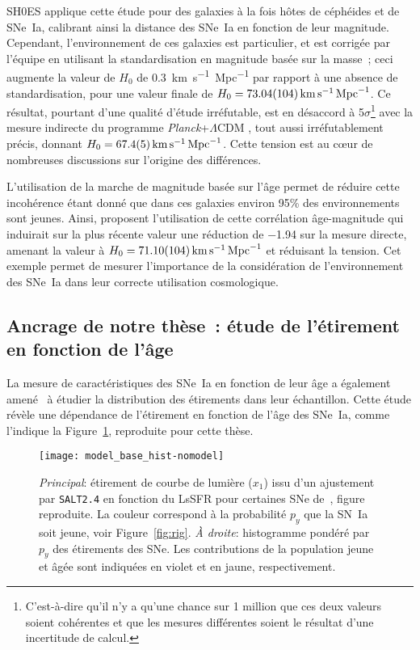 \documentclass[../main/main.tex]{subfiles}
\begin{document}
SH0ES applique cette étude pour des galaxies à la fois hôtes de céphéides et de
SNe~Ia, calibrant ainsi la distance des SNe~Ia en fonction de leur magnitude.
Cependant, l'environnement de ces galaxies est particulier, et est corrigée par
l'équipe en utilisant la standardisation en magnitude basée sur la masse~; ceci
augmente la valeur de $H_0$ de \SI{0.3}{km.s^{-1}.Mpc^{-1}} par rapport à une
absence de standardisation, pour une valeur finale de $H_0 =
\SI{73.04\pm1.04}{km.s^{-1}.Mpc^{-1}}$. Ce résultat, pourtant d'une qualité
d'étude irréfutable, est en désaccord à 5$\sigma$\footnote{C'est-à-dire qu'il
    n'y a qu'une chance sur 1 million que ces deux valeurs soient cohérentes et
que les mesures différentes soient le résultat d'une incertitude de calcul.}
avec la mesure indirecte du programme \textit{Planck}+$\Lambda$CDM
\citep{planck2018}, tout aussi irréfutablement précis, donnant $H_0 =
\SI{67.4\pm0.5}{km.s^{-1}.Mpc^{-1}}$. Cette tension est au cœur de
nombreuses discussions sur l'origine des différences.

L'utilisation de la marche de magnitude basée sur l'âge permet de réduire cette
incohérence étant donné que dans ces galaxies environ 95\% des environnements
sont jeunes. Ainsi, \cite{rigault2015} proposent l'utilisation de cette
corrélation âge-magnitude qui induirait sur la plus récente valeur une réduction
de \num{-1.94} sur la mesure directe, amenant la valeur à $H_0 =
\SI{71.10\pm1.04}{km.s^{-1}.Mpc^{-1}}$ et réduisant la tension. Cet exemple
permet de mesurer l'importance de la considération de l'environnement des SNe~Ia
dans leur correcte utilisation cosmologique.

\subsection{Ancrage de notre thèse~: étude de l'étirement en fonction de
l'âge}\label{ssec:phdgoal}

La mesure de caractéristiques des SNe~Ia en fonction de leur âge a également
amené~\cite{rigault2020} à étudier la distribution des étirements dans leur
échantillon. Cette étude révèle une dépendance de l'étirement en fonction de
l'âge des SNe~Ia, comme l'indique la Figure~\ref{fig:x1lssfr}, reproduite pour
cette thèse.

\begin{figure}[ht]
    \centering
    \texttt{[image: model\_base\_hist-nomodel]}
    \caption[Dispersion de l'étirement en fonction du LsSFR]{\textit{Principal}:
        étirement de courbe de lumière ($x_1$) issu d'un ajustement par
        \textsc{\texttt{SALT2.4}} en fonction du LsSFR pour certaines SNe
        de~\cite{rigault2020}, figure reproduite. La couleur correspond à la
        probabilité $p_y$ que la SN~Ia soit jeune, voir Figure~\ref{fig:rig}.
        \textit{À droite}: histogramme pondéré par $p_y$ des étirements des SNe.
        Les contributions de la population jeune et âgée sont indiquées en
    violet et en jaune, respectivement.}
    \label{fig:x1lssfr}
\end{figure}
\end{document}
